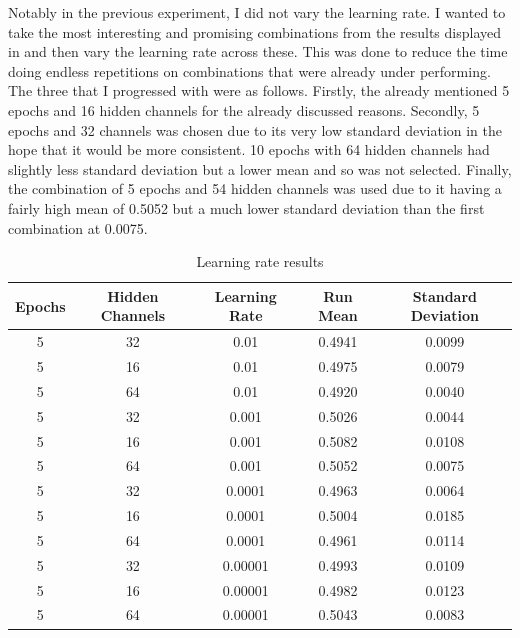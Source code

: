 \documentclass{l4proj}
\begin{document}
Notably in the previous experiment, I did not vary the learning rate. I wanted to take the most interesting and promising combinations from the results displayed in  and then vary the learning rate across these. This was done to reduce the time doing endless repetitions on combinations that were already under performing. The three that I progressed with were as follows. Firstly, the already mentioned 5 epochs and 16 hidden channels for the already discussed reasons. Secondly, 5 epochs and 32 channels was chosen due to its very low standard deviation in the hope that it would be more consistent. 10 epochs with 64 hidden channels had slightly less standard deviation but a lower mean and so was not selected. Finally, the combination of 5 epochs and 54 hidden channels was used due to it having a fairly high mean of 0.5052 but a much lower standard deviation than the first combination at 0.0075. \\

\begin{table}[h]
    \centering
    \caption{Learning rate results}
    \label{tab:Learnng_rate_results}
    \begin{tabular}{|c|c|c|c|c|}
        \hline
        \textbf{Epochs} & \textbf{Hidden Channels} & \textbf{Learning Rate} & \textbf{Run Mean} & \textbf{Standard Deviation} \\ \hline
        5 & 32 & 0.01 & 0.4941 & 0.0099 \\ \hline
        5 & 16 & 0.01 &  0.4975 & 0.0079 \\ \hline
        5 & 64 & 0.01 & 0.4920 & 0.0040 \\ \hline
        5 & 32 & 0.001 & 0.5026 & 0.0044 \\ \hline
        5 & 16 & 0.001 & 0.5082 & 0.0108 \\ \hline
        5 & 64 & 0.001 & 0.5052 & 0.0075 \\ \hline
        5 & 32 & 0.0001 & 0.4963 & 0.0064 \\ \hline
        5 & 16 & 0.0001 & 0.5004 & 0.0185 \\ \hline
        5 & 64 & 0.0001 & 0.4961 & 0.0114 \\ \hline
        5 & 32 & 0.00001 & 0.4993 & 0.0109 \\ \hline
        5 & 16 & 0.00001 & 0.4982 & 0.0123 \\ \hline
        5 & 64 & 0.00001 & 0.5043 & 0.0083 \\ \hline
    \end{tabular}
\end{table}
\end{document}
